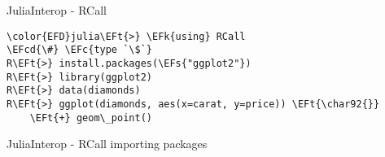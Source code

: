 \documentclass[bigger]{beamer}
\newcommand{\EFc}[1]{\textcolor{EFc}{#1}} %
\newcommand{\EFcd}[1]{\textcolor{EFcd}{#1}} %
\newcommand{\EFs}[1]{\textcolor{EFs}{#1}} %
\newcommand{\EFk}[1]{\textcolor{EFk}{#1}} %
\newcommand{\EFt}[1]{\textcolor{EFt}{#1}} %
\begin{document}
\begin{frame}[label={sec:org6f8b493},fragile]{JuliaInterop - RCall}
 \begin{Code}
\begin{Verbatim}
\color{EFD}julia\EFt{>} \EFk{using} RCall
\EFcd{\#} \EFc{type `\$`}
R\EFt{>} install.packages(\EFs{"ggplot2"})
R\EFt{>} library(ggplot2)
R\EFt{>} data(diamonds)
R\EFt{>} ggplot(diamonds, aes(x=carat, y=price)) \EFt{\char92{}}
    \EFt{+} geom\_point()
\end{Verbatim}
\end{Code}
\end{frame}

\begin{frame}[label={sec:orgbe03eea}]{JuliaInterop - RCall importing packages}
\end{frame}
\end{document}
